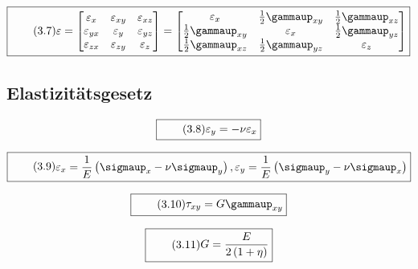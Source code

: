 \documentclass[11pt]{article}
\newcommand{\1}{ {\mathds{1}} }
\renewcommand{\epsilon}{\varepsilon}
\renewcommand{\gamma  }{\gammaup   }
\renewcommand{\sigma  }{\sigmaup   }
\begin{document}
		\begin{equation}
			\boxed{
				\tag{3.7}
				\begin{split}
					\mathbf{\epsilon}
					=
					\begin{bmatrix}
						\epsilon_{x } & \epsilon_{xy} & \epsilon_{xz} \\
						\epsilon_{yx} & \epsilon_{y } & \epsilon_{yz} \\
						\epsilon_{zx} & \epsilon_{zy} & \epsilon_{z } 
					\end{bmatrix}
					=
					\begin{bmatrix}
						\epsilon_x & \frac{1}{2}\gamma_{xy} & \frac{1}{2}\gamma_{xz}\\
						\frac{1}{2}\gamma_{xy} & \epsilon_x & \frac{1}{2}\gamma_{yz}\\
						\frac{1}{2}\gamma_{xz} & \frac{1}{2}\gamma_{yz} & \epsilon_z
					\end{bmatrix}
				\end{split}
			}
		\end{equation}

		\subsection{Elastizitätsgesetz}

		\begin{equation}
			\boxed{
				\tag{3.8}
				\begin{split}
			\varepsilon_y = -\nu \varepsilon_x
				\end{split}
			}
		\end{equation}

		\begin{equation}
			\boxed{
				\tag{3.9}
				\begin{split}
			\varepsilon_x = \frac{1}{E} \left( \sigma_x - \nu\sigma_y \right), 
			\varepsilon_y = \frac{1}{E} \left( \sigma_y - \nu\sigma_x \right)
				\end{split}
			}
		\end{equation}

		\begin{equation}
			\boxed{
				\tag{3.10}
				\begin{split}
			\tau_{xy} = G \gamma_{xy}
				\end{split}
			}
		\end{equation}

		\begin{equation}
			\boxed{
				\tag{3.11}
				\begin{split}
					G = \frac{E}{2\left(1+\eta\right)}
				\end{split}
			}
		\end{equation}
\end{document}
